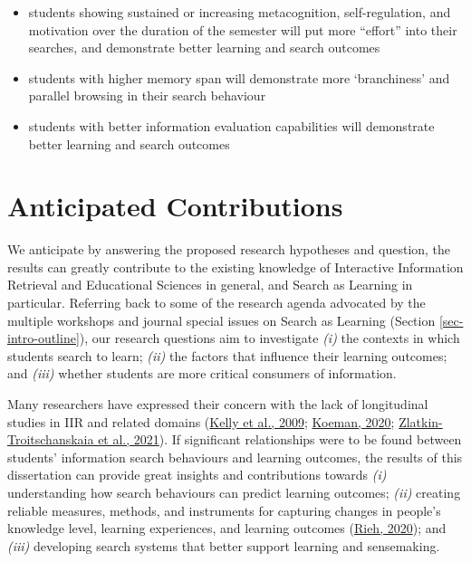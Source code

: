 \documentclass[letterpaper, nobind]{templates/ociamthesis}
\begin{document}
\begin{itemize}
\item
  students showing sustained or increasing metacognition,
  self-regulation, and motivation over the duration of the semester
  will put more ``effort'' into their searches, and demonstrate better
  learning and search outcomes
\item
  students with higher memory span will demonstrate more `branchiness'
  and parallel browsing in their search behaviour
\item
  students with better information evaluation capabilities will
  demonstrate better learning and search outcomes
\end{itemize}

\hypertarget{sec-rq-diss-contributions}{%
\section{Anticipated Contributions}\label{sec-rq-diss-contributions}}

We anticipate by answering the proposed research hypotheses and
question, the results can greatly contribute to the existing knowledge
of Interactive Information Retrieval and Educational Sciences in
general, and Search as Learning in particular. Referring back to some of
the research agenda advocated by the multiple workshops and journal
special issues on Search as Learning (Section
\ref{sec-intro-outline}), our research questions aim to
investigate \emph{(i)} the contexts in which students search to learn; \emph{(ii)}
the factors that influence their learning outcomes; and \emph{(iii)} whether
students are more critical consumers of information.

Many researchers have expressed their concern with the lack of
longitudinal studies in IIR and related domains
(\protect\hyperlink{ref-kelly2009evaluation}{Kelly et al., 2009}; \protect\hyperlink{ref-koeman2020hciux}{Koeman, 2020}; \protect\hyperlink{ref-zlatkin2021students}{Zlatkin-Troitschanskaia et al., 2021}). If
significant relationships were to be found between students' information
search behaviours and learning outcomes, the results of this
dissertation can provide great insights and contributions towards \emph{(i)}
understanding how search behaviours can predict learning outcomes;
\emph{(ii)} creating reliable measures, methods, and instruments for
capturing changes in people's knowledge level, learning experiences, and
learning outcomes (\protect\hyperlink{ref-url-rieh-homepage}{Rieh, 2020}); and \emph{(iii)} developing search
systems that better support learning and sensemaking.
\end{document}
